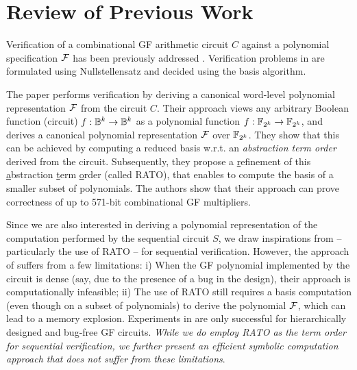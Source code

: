\section{Review of Previous Work}
\label{sec:prev}

Verification of a combinational GF arithmetic circuit $C$ against a
polynomial specification ${\mathcal{F}}$ has been previously addressed \cite{ibm:blueveri}
\cite{lv:tcad2013} \cite{pruss:dac14}. Verification problems in
\cite{ibm:blueveri} \cite{lv:tcad2013} are formulated using
Nullstellensatz and decided using the \Grobner basis algorithm.

The paper 
\cite{pruss:dac14} performs verification by deriving a canonical
word-level polynomial representation ${\mathcal{F}}$ from the circuit $C$. Their
approach views any arbitrary Boolean function (circuit) $f: {\mathbb{B}}^k
\rightarrow {\mathbb{B}}^k$ as a polynomial function $f: {\mathbb{F}}_{2^k} \rightarrow {\mathbb{F}}_{2^k}$,
and derives a canonical polynomial representation ${\mathcal{F}}$ over
${\mathbb{F}}_{2^k}$. They show that this can be achieved by computing a reduced 
\Grobner basis w.r.t. an {\it abstraction term order} derived from the
circuit. Subsequently, they propose a \underline{r}efinement of this
\underline{a}bstraction \underline{t}erm \underline{o}rder (called
RATO), that enables to compute the \Grobner basis of a smaller subset
of polynomials. The authors show that their approach can prove
correctness of up to 571-bit combinational GF multipliers. 

Since we are also interested in deriving a polynomial representation
of the computation performed by the sequential circuit $S$, we draw
inspirations from \cite{pruss:dac14} -- particularly the use of RATO
-- for sequential verification. However, the approach of
\cite{pruss:dac14} suffers from a few limitations: i) When the GF
polynomial implemented by the circuit is dense (say,  due to the
presence of a bug in the design), their approach is computationally
infeasible; ii) The use of RATO still requires a \Grobner basis
computation (even though on a subset of polynomials) to derive the
polynomial ${\mathcal{F}}$, which can lead to a memory explosion. Experiments in
\cite{pruss:dac14} are only successful for hierarchically designed and
bug-free GF circuits. {\it While we do employ RATO as the term order
  for sequential verification, we further present an efficient
  symbolic computation approach that does not suffer from these
  limitations}. 

